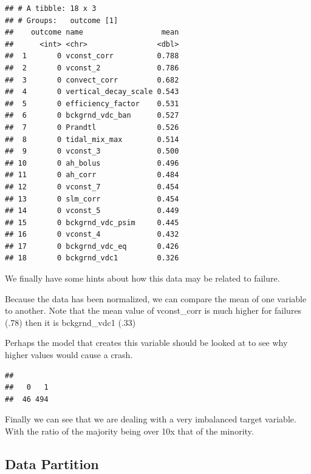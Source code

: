 \documentclass[
  11pt,
]{article}
\newenvironment{Shaded}{\begin{snugshade}}{\end{snugshade}}
\newcommand{\KeywordTok}[1]{\textcolor[rgb]{0.13,0.29,0.53}{\textbf{#1}}}
\newcommand{\NormalTok}[1]{#1}
\newcommand{\OperatorTok}[1]{\textcolor[rgb]{0.81,0.36,0.00}{\textbf{#1}}}
\begin{document}
\begin{verbatim}
## # A tibble: 18 x 3
## # Groups:   outcome [1]
##    outcome name                  mean
##      <int> <chr>                <dbl>
##  1       0 vconst_corr          0.788
##  2       0 vconst_2             0.786
##  3       0 convect_corr         0.682
##  4       0 vertical_decay_scale 0.543
##  5       0 efficiency_factor    0.531
##  6       0 bckgrnd_vdc_ban      0.527
##  7       0 Prandtl              0.526
##  8       0 tidal_mix_max        0.514
##  9       0 vconst_3             0.500
## 10       0 ah_bolus             0.496
## 11       0 ah_corr              0.484
## 12       0 vconst_7             0.454
## 13       0 slm_corr             0.454
## 14       0 vconst_5             0.449
## 15       0 bckgrnd_vdc_psim     0.445
## 16       0 vconst_4             0.432
## 17       0 bckgrnd_vdc_eq       0.426
## 18       0 bckgrnd_vdc1         0.326
\end{verbatim}

We finally have some hints about how this data may be related to
failure.

Because the data has been normalized, we can compare the mean of one
variable to another. Note that the mean value of vconst\_corr is much
higher for failures (.78) then it is bckgrnd\_vdc1 (.33)

Perhaps the model that creates this variable should be looked at to see
why higher values would cause a crash.

\begin{Shaded}
\end{Shaded}

\begin{verbatim}
## 
##   0   1 
##  46 494
\end{verbatim}

Finally we can see that we are dealing with a very imbalanced target
variable. With the ratio of the majority being over 10x that of the
minority.

\hypertarget{data-partition}{%
\subsection{Data Partition}\label{data-partition}}
\end{document}
